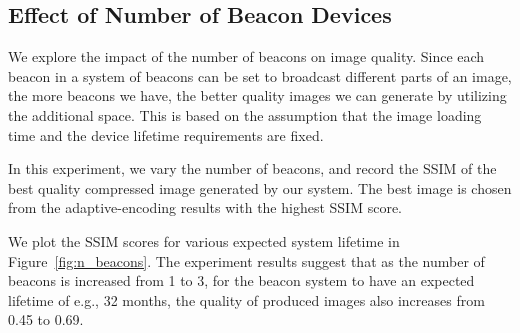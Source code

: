 \subsection{Effect of Number of Beacon Devices}

We explore the impact of the number of beacons on image quality. Since each beacon in a system of beacons can be set to broadcast different parts of an image, the more beacons we have, the better quality images we can generate by utilizing the additional space. This is based on the assumption that the image loading time and the device lifetime requirements are fixed.

In this experiment, we vary the number of beacons, and record the SSIM of the best quality compressed image generated by our system. The best image is chosen from the adaptive-encoding results with the highest SSIM score.

We plot the SSIM scores for various expected system lifetime in Figure~\ref{fig:n_beacons}. The experiment results suggest that as the number of beacons is increased from 1 to 3, for the beacon system to have an expected lifetime of e.g., 32 months, the quality of produced images also increases from 0.45 to 0.69.


